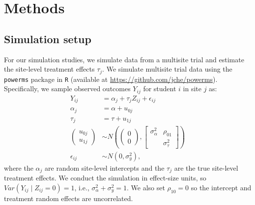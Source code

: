 \documentclass[]{article}
\begin{document}

\section{Methods}

\subsection{Simulation setup}
\label{sec:simsetup}

For our simulation studies, we simulate data from a multisite trial and estimate the site-level treatment effects $\tau_j$.
We simulate multisite trial data using the \texttt{powerms} package in \texttt{R} (available at \href{https://github.com/jche/powerms}{https://github.com/jche/powerms}).
Specifically, we sample observed outcomes $Y_{ij}$ for student $i$ in site $j$ as:
\begin{align*}
	Y_{ij} &= \alpha_j + \tau_j Z_{ij} + \epsilon_{ij} \\
	\alpha_j &= \alpha + u_{0j} \\
	\tau_j &= \tau + u_{1j} \\
	\begin{pmatrix}
		u_{0j} \\ u_{1j}
	\end{pmatrix} &\sim N\left(
	\begin{pmatrix}
		0 \\ 0
	\end{pmatrix}, 
	\begin{bmatrix}
		\sigma^2_\alpha & \rho_{01} \\  & \sigma^2_\tau
	\end{bmatrix}\right) \\
	\epsilon_{ij} &\sim N(0, \sigma^2_y) ,
\end{align*}
where the $\alpha_j$ are random site-level intercepts and the $\tau_j$ are the true site-level treatment effects.
We conduct the simulation in effect-size units, so $Var(Y_{ij} \mid Z_{ij}=0)=1$, i.e., $\sigma^2_\alpha + \sigma^2_y = 1$.
We also set $\rho_{10}=0$ so the intercept and treatment random effects are uncorrelated.
\end{document}

